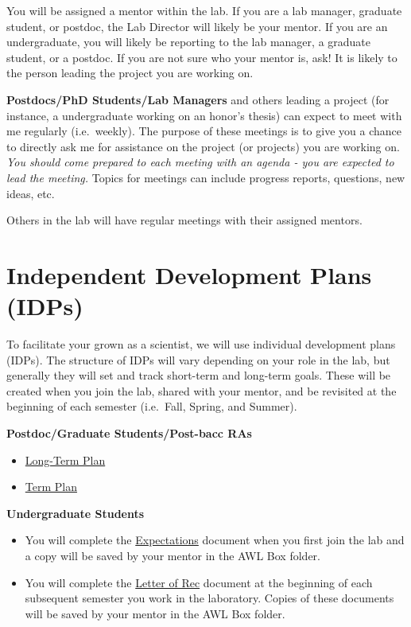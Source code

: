 \documentclass[]{book}
\begin{document}
You will be assigned a mentor within the lab. If you are a lab manager, graduate student, or postdoc, the Lab Director will likely be your mentor. If you are an undergraduate, you will likely be reporting to the lab manager, a graduate student, or a postdoc. If you are not sure who your mentor is, ask! It is likely to the person leading the project you are working on.

\textbf{Postdocs/PhD Students/Lab Managers} and others leading a project (for instance, a undergraduate working on an honor's thesis) can expect to meet with me regularly (i.e.~weekly). The purpose of these meetings is to give you a chance to directly ask me for assistance on the project (or projects) you are working on. \emph{You should come prepared to each meeting with an agenda - you are expected to lead the meeting.} Topics for meetings can include progress reports, questions, new ideas, etc.

Others in the lab will have regular meetings with their assigned mentors.

\hypertarget{independent-development-plans-idps}{%
\section{Independent Development Plans (IDPs)}\label{independent-development-plans-idps}}

To facilitate your grown as a scientist, we will use individual development plans (IDPs). The structure of IDPs will vary depending on your role in the lab, but generally they will set and track short-term and long-term goals. These will be created when you join the lab, shared with your mentor, and be revisited at the beginning of each semester (i.e.~Fall, Spring, and Summer).

\textbf{Postdoc/Graduate Students/Post-bacc RAs}

\begin{itemize}
\item
  \href{https://docs.google.com/spreadsheets/d/1bCDeeGkJB_FUFfNlh3WZWZc7nBfc02Cx-rKyZ3bUmZY/edit?usp=sharing}{Long-Term Plan}
\item
  \href{https://docs.google.com/spreadsheets/d/1W-xCC_8to6XuGHu43wUICSiIFMPN1enipK5AzDeoi9k/edit?usp=sharing}{Term Plan}
\end{itemize}

\textbf{Undergraduate Students}

\begin{itemize}
\item
  You will complete the \href{https://drive.google.com/file/d/1SMBHT4_-o3uOZO_1NsZfPhd7DiCtxzk-/view?usp=sharing}{Expectations} document when you first join the lab and a copy will be saved by your mentor in the AWL Box folder.
\item
  You will complete the \href{https://drive.google.com/file/d/1-fT-UUQl8cwaDV_kTXRV8TXlwEIqiMu2/view?usp=sharing}{Letter of Rec} document at the beginning of each subsequent semester you work in the laboratory. Copies of these documents will be saved by your mentor in the AWL Box folder.
\end{itemize}
\end{document}

